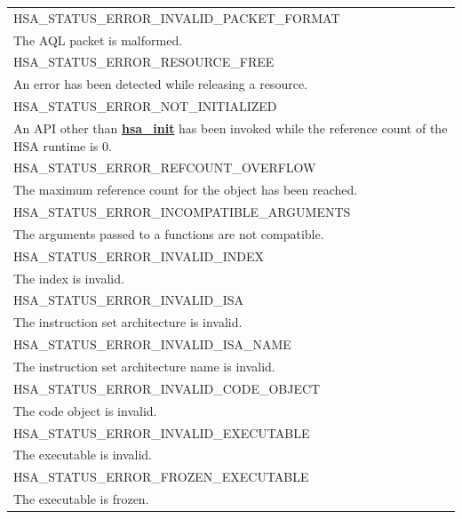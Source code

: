 \documentclass[final,oneside]{book}
\newcommand{\reffun}[1]{\textbf{#1}}
\newcommand{\reftyp}[1]{#1}
\newcommand{\refenu}[1]{\reftyp{#1}}
\begin{document}
\begin{longtable}{@{\hspace{2em}}p{\linewidth-2em}}
\hspace{-2em}\refenu{HSA_\-STATUS_\-ERROR_\-INVALID_\-PACKET_\-FORMAT}\\The AQL packet is malformed.\\[2mm]
\hspace{-2em}\refenu{HSA_\-STATUS_\-ERROR_\-RESOURCE_\-FREE}\\An error has been detected while releasing a resource.\\[2mm]
\hspace{-2em}\refenu{HSA_\-STATUS_\-ERROR_\-NOT_\-INITIALIZED}\\An API other than \hyperlink{group__initshutdown_1ga5b8574433e7dbcbd31ea397a02e3c32b}{\reffun{hsa_\-init}} has been invoked while the reference count of the HSA runtime is 0.\\[2mm]
\hspace{-2em}\refenu{HSA_\-STATUS_\-ERROR_\-REFCOUNT_\-OVERFLOW}\\The maximum reference count for the object has been reached.\\[2mm]
\hspace{-2em}\refenu{HSA_\-STATUS_\-ERROR_\-INCOMPATIBLE_\-ARGUMENTS}\\The arguments passed to a functions are not compatible.\\[2mm]
\hspace{-2em}\refenu{HSA_\-STATUS_\-ERROR_\-INVALID_\-INDEX}\\The index is invalid.\\[2mm]
\hspace{-2em}\refenu{HSA_\-STATUS_\-ERROR_\-INVALID_\-ISA}\\The instruction set architecture is invalid.\\[2mm]
\hspace{-2em}\refenu{HSA_\-STATUS_\-ERROR_\-INVALID_\-ISA_\-NAME}\\The instruction set architecture name is invalid.\\[2mm]
\hspace{-2em}\refenu{HSA_\-STATUS_\-ERROR_\-INVALID_\-CODE_\-OBJECT}\\The code object is invalid.\\[2mm]
\hspace{-2em}\refenu{HSA_\-STATUS_\-ERROR_\-INVALID_\-EXECUTABLE}\\The executable is invalid.\\[2mm]
\hspace{-2em}\refenu{HSA_\-STATUS_\-ERROR_\-FROZEN_\-EXECUTABLE}\\The executable is frozen.\\[2mm]

\end{longtable}
\end{document}

